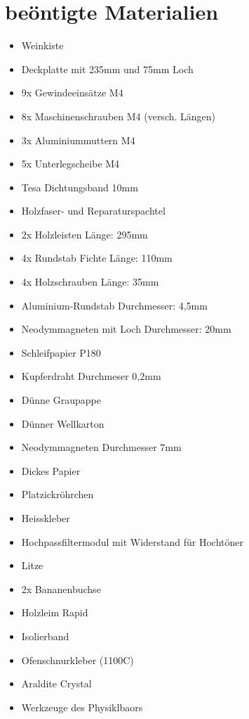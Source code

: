 \documentclass[a4paper,11pt]{report}
\begin{document}
\section{beöntigte Materialien}
\begin{multicols}{2}
    \begin{itemize}[parsep=0pt]
        \item Weinkiste
        \item Deckplatte mit 235mm und 75mm Loch
        \item 9x Gewindeeinsätze M4
        \item 8x Maschinenschrauben M4 (versch. Längen)
        \item 3x Aluminiummuttern M4
        \item 5x Unterlegscheibe M4
        \item Tesa Dichtungsband 10mm
        \item Holzfaser- und Reparaturspachtel
        \item 2x Holzleisten Länge: 295mm
        \item 4x Rundstab Fichte Länge: 110mm
        \item 4x Holzschrauben Länge: 35mm
        \item Aluminium-Rundstab Durchmesser: 4,5mm
        \item Neodymmagneten mit Loch Durchmesser: 20mm
        \item Schleifpapier P180
        \item Kupferdraht Durchmeser 0,2mm
        \item Dünne Graupappe
        \item Dünner Wellkarton
        \item Neodymmagneten Durchmesser 7mm
        \item Dickes Papier
        \item Platzickröhrchen
        \item Heisskleber
        \item Hochpassfiltermodul mit Widerstand für Hochtöner
        \item Litze
        \item 2x Bananenbuchse
        \item Holzleim Rapid
        \item Isolierband
        \item Ofenschnurkleber (1100\textdegree C)
        \item Araldite Crystal
        \item Werkzeuge des Physiklbaors
    \end{itemize}
\end{multicols}
\end{document}
